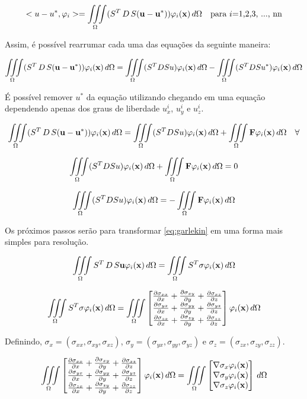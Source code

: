 \begin{equation}
\label{eq:proint_energia}
<u-u^*, \varphi_i> = \omeint{(S^T\,D\,S(\mathbf{u - u^*})) \phiix} \quad \text{para $i$=1,2,3, ..., nn}
\end{equation}

Assim, é possível rearrumar cada uma das equações da seguinte maneira:


\begin{equation}
\omeint{(S^T\,D\,S(\mathbf{u - u^*})) \phiix}  =  \omeint{(S^TDSu)\phiix} - \omeint{(S^TDSu^*)\phiix}              
\end{equation}

É possível remover $u^*$ da equação utilizando \label{eq:edp_geomec} chegando em uma equação dependendo apenas dos graus de liberdade $u^i_x$, $u^i_y$ e $u^i_z$.

\begin{equation}
\omeint{(S^T\,D\,S(\mathbf{u - u^*})) \phiix}  =  \omeint{(S^TDSu)\phiix} + \omeint{\mathbf{F}\phiix} \quad \forall     
\end{equation}

\begin{equation}
\omeint{(S^TDSu)\phiix} + \omeint{\mathbf{F}\phiix} = 0
\end{equation}

\begin{equation} \label{eq:garlekin}
\omeint{(S^TDSu)\phiix} = - \omeint{\mathbf{F}\phiix}
\end{equation}



Os próximos passos serão para transformar \ref{eq:garlekin} em uma forma mais simples para resolução. 

\begin{equation}
\omeint{S^T\,D\,S\mathbf{u} \phiix} = \omeint{S^T\sigma \phiix}
\end{equation}

\begin{equation}
\omeint{S^T\sigma \phiix} = \omeint{\sstensor \phiix} 
\end{equation}

Definindo, $\sigma_x = (\sigma_{xx}, \sigma_{xy}, \sigma_{xz})$, $\sigma_y = (\sigma_{yx}, \sigma_{yy}, \sigma_{yz})$ e $\sigma_z = (\sigma_{zx}, \sigma_{zy}, \sigma_{zz})$.

\begin{equation}\label{eq:grad}
\omeint{\sstensor \phiix} = \omeint{
\begin{bmatrix}
\nabla \sigma_x \phiix\\ \nabla \sigma_y \phiix \\ \nabla \sigma_z \phiix
\end{bmatrix}}
\end{equation}


